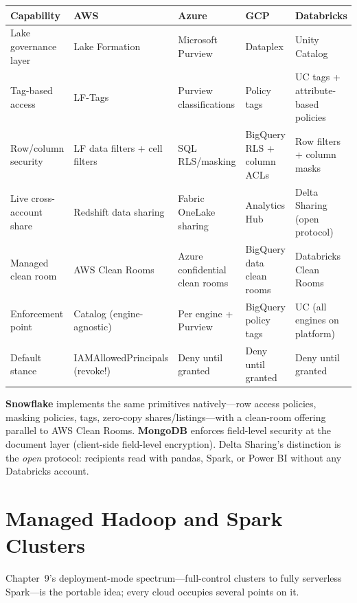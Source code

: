 \begin{center}
\footnotesize
\begin{tabular}{@{}p{2.4cm}p{2.9cm}p{2.9cm}p{2.9cm}p{2.9cm}@{}}
\toprule
\textbf{Capability} & \textbf{AWS} & \textbf{Azure} & \textbf{GCP} & \textbf{Databricks} \\
\midrule
Lake governance layer & Lake Formation & Microsoft Purview & Dataplex & Unity Catalog \\
Tag-based access & LF-Tags & Purview classifications & Policy tags & UC tags + attribute-based policies \\
Row/column security & LF data filters + cell filters & SQL RLS/masking & BigQuery RLS + column ACLs & Row filters + column masks \\
Live cross-account share & Redshift data sharing & Fabric OneLake sharing & Analytics Hub & Delta Sharing (open protocol) \\
Managed clean room & AWS Clean Rooms & Azure confidential clean rooms & BigQuery data clean rooms & Databricks Clean Rooms \\
\addlinespace
Enforcement point & Catalog (engine-agnostic) & Per engine + Purview & BigQuery policy tags & UC (all engines on platform) \\
Default stance & IAMAllowedPrincipals (revoke!) & Deny until granted & Deny until granted & Deny until granted \\
\bottomrule
\end{tabular}
\end{center}

\noindent \textbf{Snowflake} implements the same primitives natively---row access policies,
masking policies, tags, zero-copy shares/listings---with a clean-room offering parallel to AWS
Clean Rooms. \textbf{MongoDB} enforces field-level security at the document layer (client-side
field-level encryption). Delta Sharing's distinction is the \emph{open} protocol: recipients read
with pandas, Spark, or Power BI without any Databricks account.

\section{Managed Hadoop and Spark Clusters}
%
Chapter~9's deployment-mode spectrum---full-control clusters to fully serverless Spark---is the
portable idea; every cloud occupies several points on it.

